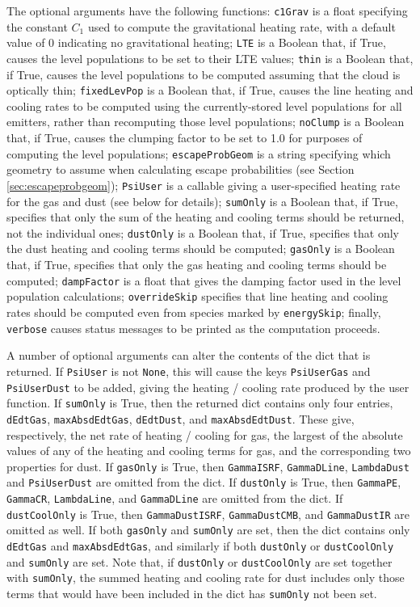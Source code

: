 \documentclass[12pt]{article}
\begin{document}
The optional arguments have the following functions: \verb=c1Grav= is a float specifying the constant $C_1$ used to compute the gravitational heating rate, with a default value of 0 indicating no gravitational heating; \verb=LTE= is a Boolean that, if True, causes the level populations to be set to their LTE values; \verb=thin= is a Boolean that, if True, causes the level populations to be computed assuming that the cloud is optically thin; \verb=fixedLevPop= is a Boolean that, if True, causes the line heating and cooling rates to be computed using the currently-stored level populations for all emitters, rather than recomputing those level populations; \verb=noClump= is a Boolean that, if True, causes the clumping factor to be set to 1.0 for purposes of computing the level populations; \verb=escapeProbGeom= is a string specifying which geometry to assume when calculating escape probabilities (see Section \ref{sec:escapeprobgeom}); \verb=PsiUser= is a callable giving a user-specified heating rate for the gas and dust (see below for details); \verb=sumOnly= is a Boolean that, if True, specifies that only the sum of the heating and cooling terms should be returned, not the individual ones; \verb=dustOnly= is a Boolean that, if True, specifies that only the dust heating and cooling terms should be computed; \verb=gasOnly= is a Boolean that, if True, specifies that only the gas heating and cooling terms should be computed; \verb=dampFactor= is a float that gives the damping factor used in the level population calculations; \verb=overrideSkip= specifies that line heating and cooling rates should be computed even from species marked by \verb=energySkip=; finally, \verb=verbose= causes status messages to be printed as the computation proceeds.

A number of optional arguments can alter the contents of the dict that is returned. If \verb=PsiUser= is not \verb=None=, this will cause the keys \verb=PsiUserGas= and \verb=PsiUserDust= to be added, giving the heating / cooling rate produced by the user function. If \verb=sumOnly= is True, then the returned dict contains only four entries, \verb=dEdtGas=, \verb=maxAbsdEdtGas=, \verb=dEdtDust=, and \verb=maxAbsdEdtDust=. These give, respectively, the net rate of heating / cooling for gas, the largest of the absolute values of any of the heating and cooling terms for gas, and the corresponding two properties for dust. If \verb=gasOnly= is True, then \verb=GammaISRF=, \verb=GammaDLine=, \verb=LambdaDust= and \verb=PsiUserDust= are omitted from the dict. If \verb=dustOnly= is True, then \verb=GammaPE=, \verb=GammaCR=, \verb=LambdaLine=, and \verb=GammaDLine= are omitted from the dict. If \verb=dustCoolOnly= is True, then \verb=GammaDustISRF=, \verb=GammaDustCMB=, and \verb=GammaDustIR= are omitted as well. If both \verb=gasOnly= and \verb=sumOnly= are set, then the dict contains only \verb=dEdtGas= and \verb=maxAbsdEdtGas=, and similarly if both \verb=dustOnly= or \verb=dustCoolOnly= and \verb=sumOnly= are set. Note that, if \verb=dustOnly= or \verb=dustCoolOnly= are set together with \verb=sumOnly=, the summed heating and cooling rate for dust includes only those terms that would have been included in the dict has \verb=sumOnly= not been set.
\end{document}
